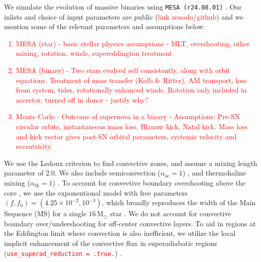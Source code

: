 \documentclass[linenumbers,trackchanges,twocolumn]{aastex701}
\newcommand{\Mdot}{\mathrm{M}_{\odot}}
\newcommand{\red}{\textcolor{red}}
\begin{document}
We simulate the evolution of massive binaries using \texttt{MESA (r24.08.01)} \citep{2011ApJS..192....3P,2013ApJS..208....4P,2015ApJS..220...15P,2018ApJS..234...34P,2019ApJS..243...10P,2023ApJS..265...15J}. Our inlists and choice of input parameters are public (\red{link zenodo/github}) and we mention some of the relevant parameters and assumptions below.

\red{
\begin{enumerate}
    \item MESA (star) - basic stellar physics assumptions - MLT, overshooting, other mixing, rotation, winds, supereddington treatment
    \item MESA (binary) - Two stars evolved self consistently, along with orbit equations. Treatment of mass transfer (Kolb \& Ritter), AM transport, loss from system, tides, rotationally enhanced winds. Rotation only included in accretor, turned off in donor - justify why? 
    \item Monte Carlo - Outcome of supernova in a binary - Assumptions: Pre-SN circular orbits, instantaneous mass loss, Blauuw kick, Natal kick. Mass loss and kick vector gives post-SN orbital parameters, systemic velocity and eccentricity.
\end{enumerate}
}

We use the Ledoux criterion \citep{1947ApJ...105..305L} to find convective zones, and assume a mixing length parameter of 2.0. We also include semiconvection ($\alpha_{\mathrm{sc}}=1$) \citep{1983A&A...126..207L}, and thermohaline mixing ($\alpha_{\mathrm{th}}=1$) \citep{1980A&A....91..175K}. To account for convective boundary overshooting above the core \citep{2000A&A...360..952H,2018ApJ...859..100C}, we use the exponentional model with free parameters $(f,f_0) = (4.25 \times 10^{-2}, 10^{-3})$, which broadly reproduces the width of the Main Sequence (MS) for a single $16 \, \Mdot$ star \citep{2011A&A...530A.115B}. We do not account for convective boundary over/undershooting for off-center convective layers. To aid in regions at the Eddington limit where convection is also inefficient, we utilize the local implicit enhancement of the convective flux in superadiabatic regions (\texttt{\red{use\_superad\_reduction = .true.}}) \citep{2023ApJS..265...15J}.
\end{document}
